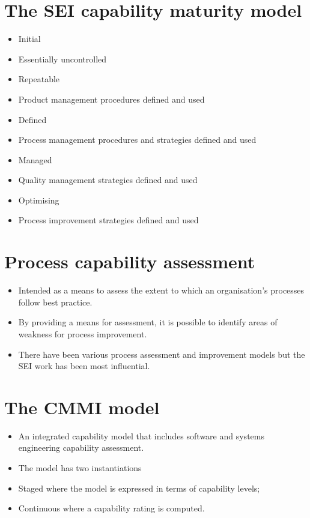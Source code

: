 \section{The SEI capability maturity model}
\begin{itemize}

\item Initial

   \item Essentially uncontrolled \item Repeatable
   \item Product management procedures defined and used \item Defined
   \item Process management procedures and strategies defined and used

\item Managed

   \item Quality management strategies defined and used \item Optimising
   \item Process improvement strategies defined and used

\end{itemize}

\section{Process capability assessment}
\begin{itemize}

\item Intended as a means to assess the extent to which an organisation’s processes follow best practice.

\item By providing a means for assessment, it is possible to identify areas of weakness for process improvement.

\item There have been various process assessment and improvement models but the SEI work has been most influential.

\end{itemize}

\section{The CMMI model}
\begin{itemize}

\item An integrated capability model that includes software and systems engineering capability assessment.

\item The model has two instantiations

   \item Staged where the model is expressed in terms of capability levels;
   \item Continuous where a capability rating is computed.


\end{itemize}

